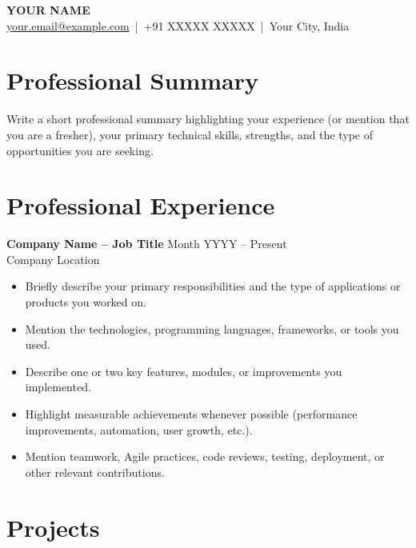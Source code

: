 \documentclass[a4paper,10pt]{article}
\begin{document}
\begin{center}
    {\LARGE \textbf{YOUR NAME}}\\
    \vspace{2mm}
    \href{mailto:your.email@example.com}{your.email@example.com} \,|\, +91 XXXXX XXXXX \,|\, Your City, India
\end{center}

\section*{Professional Summary}

Write a short professional summary highlighting your experience (or mention that you are a fresher), your primary technical skills, strengths, and the type of opportunities you are seeking.

\vspace{-2mm}

\section*{Professional Experience}

\textbf{Company Name -- Job Title} \hfill Month YYYY -- Present\\
Company Location

\vspace{-2mm}

\begin{itemize}
    \item Briefly describe your primary responsibilities and the type of applications or products you worked on.
    
    \item Mention the technologies, programming languages, frameworks, or tools you used.
    
    \item Describe one or two key features, modules, or improvements you implemented.
    
    \item Highlight measurable achievements whenever possible (performance improvements, automation, user growth, etc.).
    
    \item Mention teamwork, Agile practices, code reviews, testing, deployment, or other relevant contributions.
\end{itemize}

\vspace{-2mm}

\section*{Projects}
\end{document}
